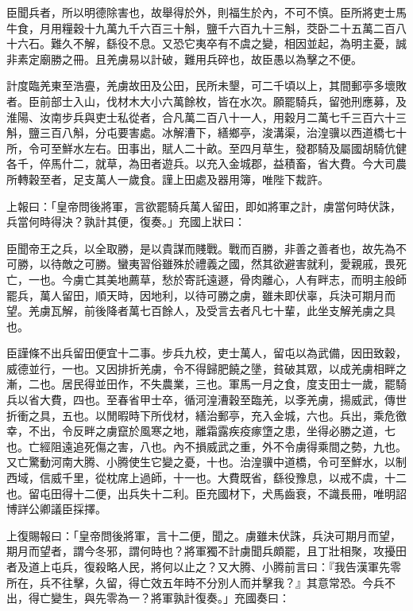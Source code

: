 \begin{pinyinscope}
臣聞兵者，所以明德除害也，故舉得於外，則福生於內，不可不慎。臣所將吏士馬牛食，月用糧穀十九萬九千六百三十斛，鹽千六百九十三斛，茭卧二十五萬二百八十六石。難久不解，繇役不息。又恐它夷卒有不虞之變，相因並起，為明主憂，誠非素定廟勝之冊。且羌虜易以計破，難用兵碎也，故臣愚以為擊之不便。

計度臨羌東至浩亹，羌虜故田及公田，民所未墾，可二千頃以上，其間郵亭多壞敗者。臣前部士入山，伐材木大小六萬餘枚，皆在水次。願罷騎兵，留弛刑應募，及淮陽、汝南步兵與吏士私從者，合凡萬二百八十一人，用穀月二萬七千三百六十三斛，鹽三百八斛，分屯要害處。冰解漕下，繕鄉亭，浚溝渠，治湟骥以西道橋七十所，令可至鮮水左右。田事出，賦人二十畝。至四月草生，發郡騎及屬國胡騎伉健各千，倅馬什二，就草，為田者遊兵。以充入金城郡，益積畜，省大費。今大司農所轉穀至者，足支萬人一歲食。謹上田處及器用簿，唯陛下裁許。

上報曰：「皇帝問後將軍，言欲罷騎兵萬人留田，即如將軍之計，虜當何時伏誅，兵當何時得決？孰計其便，復奏。」充國上狀曰：

臣聞帝王之兵，以全取勝，是以貴謀而賤戰。戰而百勝，非善之善者也，故先為不可勝，以待敵之可勝。蠻夷習俗雖殊於禮義之國，然其欲避害就利，愛親戚，畏死亡，一也。今虜亡其美地薦草，愁於寄託遠遯，骨肉離心，人有畔志，而明主般師罷兵，萬人留田，順天時，因地利，以待可勝之虜，雖未即伏辜，兵決可期月而望。羌虜瓦解，前後降者萬七百餘人，及受言去者凡七十輩，此坐支解羌虜之具也。

臣謹條不出兵留田便宜十二事。步兵九校，吏士萬人，留屯以為武備，因田致穀，威德並行，一也。又因排折羌虜，令不得歸肥饒之墬，貧破其眾，以成羌虜相畔之漸，二也。居民得並田作，不失農業，三也。軍馬一月之食，度支田士一歲，罷騎兵以省大費，四也。至春省甲士卒，循河湟漕穀至臨羌，以斈羌虜，揚威武，傳世折衝之具，五也。以閒暇時下所伐材，繕治郵亭，充入金城，六也。兵出，乘危徼幸，不出，令反畔之虜竄於風寒之地，離霜露疾疫瘃墯之患，坐得必勝之道，七也。亡經阻遠追死傷之害，八也。內不損威武之重，外不令虜得乘間之勢，九也。又亡驚動河南大腾、小腾使生它變之憂，十也。治湟骥中道橋，令可至鮮水，以制西域，信威千里，從枕席上過師，十一也。大費既省，繇役豫息，以戒不虞，十二也。留屯田得十二便，出兵失十二利。臣充國材下，犬馬齒衰，不識長冊，唯明詔博詳公卿議臣採擇。

上復賜報曰：「皇帝問後將軍，言十二便，聞之。虜雖未伏誅，兵決可期月而望，期月而望者，謂今冬邪，謂何時也？將軍獨不計虜聞兵頗罷，且丁壯相聚，攻擾田者及道上屯兵，復殺略人民，將何以止之？又大腾、小腾前言曰：『我告漢軍先零所在，兵不往擊，久留，得亡效五年時不分別人而并擊我？』其意常恐。今兵不出，得亡變生，與先零為一？將軍孰計復奏。」充國奏曰：


\end{pinyinscope}

